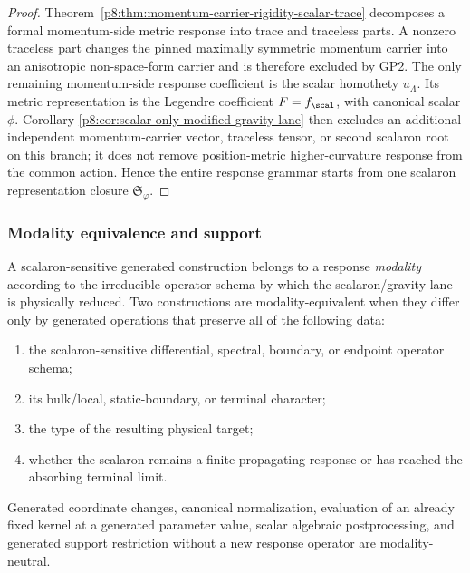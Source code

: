 \documentclass[12pt,a4paper]{article}
\begin{document}
\begin{proof}
Theorem~\ref{p8:thm:momentum-carrier-rigidity-scalar-trace} decomposes a formal
momentum-side metric response into trace and traceless parts.  A nonzero
traceless part changes the pinned maximally symmetric momentum carrier into an
anisotropic non-space-form carrier and is therefore excluded by GP2.  The only
remaining momentum-side response coefficient is the scalar homothety
$u_{\Lambda}$.  Its metric representation is the Legendre coefficient
$F=f_{\scal}$, with canonical scalar $\phi$.  Corollary
\ref{p8:cor:scalar-only-modified-gravity-lane} then excludes an additional independent momentum-carrier vector,
traceless tensor, or second scalaron root on this branch; it does not
remove position-metric higher-curvature response from the common action.
Hence the entire response grammar starts from one scalaron representation
closure $\mathfrak S_{\varphi}$.  \qedhere
\end{proof}

\subsubsection{Modality equivalence and support}

\begin{definition}
\label{p8:def:scalaron-response-modality}
A scalaron-sensitive generated construction belongs to a response
\emph{modality} according to the irreducible operator schema by which the
scalaron/gravity lane is physically reduced.  Two constructions are
modality-equivalent when they differ only by generated operations that preserve
all of the following data:
\begin{enumerate}
\item the scalaron-sensitive differential, spectral, boundary, or endpoint
      operator schema;
\item its bulk/local, static-boundary, or terminal character;
\item the type of the resulting physical target;
\item whether the scalaron remains a finite propagating response or has reached
      the absorbing terminal limit.
\end{enumerate}
Generated coordinate changes, canonical normalization, evaluation of an
already fixed kernel at a generated parameter value, scalar algebraic
postprocessing, and generated support restriction without a new response
operator are modality-neutral.
\end{definition}
\end{document}
